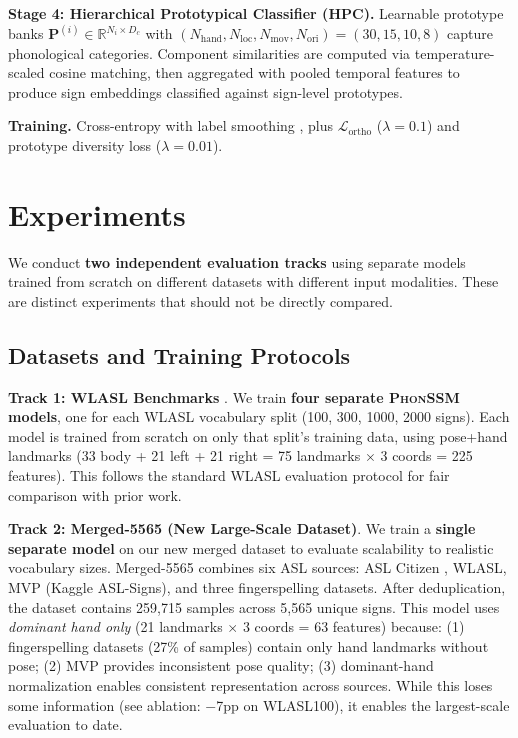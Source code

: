 \documentclass[sigconf,nonacm,anonymous]{acmart}
\theoremstyle{definition}
\theoremstyle{remark}
\newcommand{\phonssm}{\textsc{PhonSSM}}
\newcommand{\hpc}{\textsc{HPC}}
\begin{document}
\textbf{Stage 4: Hierarchical Prototypical Classifier (\hpc{}).} Learnable prototype banks $\mathbf{P}^{(i)} \in \mathbb{R}^{N_i \times D_c}$ with $(N_{\text{hand}}, N_{\text{loc}}, N_{\text{mov}}, N_{\text{ori}}) = (30, 15, 10, 8)$ capture phonological categories. Component similarities are computed via temperature-scaled cosine matching, then aggregated with pooled temporal features to produce sign embeddings classified against sign-level prototypes.

\textbf{Training.} Cross-entropy with label smoothing \cite{szegedy2016rethinking}, plus $\mathcal{L}_{\text{ortho}}$ ($\lambda{=}0.1$) and prototype diversity loss ($\lambda{=}0.01$).


\FloatBarrier
\section{Experiments}
\label{sec:experiments}

We conduct \textbf{two independent evaluation tracks} using separate models trained from scratch on different datasets with different input modalities. These are distinct experiments that should not be directly compared.

\subsection{Datasets and Training Protocols}

\textbf{Track 1: WLASL Benchmarks} \cite{li2020word}. We train \textbf{four separate \phonssm{} models}, one for each WLASL vocabulary split (100, 300, 1000, 2000 signs). Each model is trained from scratch on only that split's training data, using pose+hand landmarks (33 body + 21 left + 21 right = 75 landmarks $\times$ 3 coords = 225 features). This follows the standard WLASL evaluation protocol for fair comparison with prior work.

\textbf{Track 2: Merged-5565 (New Large-Scale Dataset)}. We train a \textbf{single separate model} on our new merged dataset to evaluate scalability to realistic vocabulary sizes. Merged-5565 combines six ASL sources: ASL Citizen \cite{desai2023asl}, WLASL, MVP (Kaggle ASL-Signs), and three fingerspelling datasets. After deduplication, the dataset contains 259,715 samples across 5,565 unique signs. This model uses \textit{dominant hand only} (21 landmarks $\times$ 3 coords = 63 features) because: (1) fingerspelling datasets (27\% of samples) contain only hand landmarks without pose; (2) MVP provides inconsistent pose quality; (3) dominant-hand normalization enables consistent representation across sources. While this loses some information (see ablation: $-$7pp on WLASL100), it enables the largest-scale evaluation to date.
\end{document}

